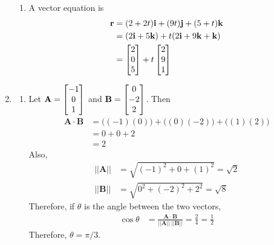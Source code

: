 \documentclass{article}
\begin{document}
\begin{enumerate}
\begin{enumerate}
\item 
A vector equation is 
\begin{align*}
\mathbf{r} &= (2+2t)\mathbf{i} + (9t)\mathbf{j} + (5+t)\mathbf{k} \\
&= (2\mathbf{i} + 5\mathbf{k}) + t(2\mathbf{i} + 9\mathbf{k} + \mathbf{k}) \\
&= \begin{bmatrix} 2 \\ 0 \\ 5 \end{bmatrix} + t \begin{bmatrix} 2 \\ 9 \\1 \end{bmatrix}
\end{align*}
\end{enumerate}
\item
\begin{enumerate}
\item 
Let $\mathbf{A} = \begin{bmatrix}-1 \\ 0 \\ 1\end{bmatrix}$ and $\mathbf{B} = \begin{bmatrix} 0 \\ -2 \\ 2 \end{bmatrix}$. Then
\begin{align*}
  \mathbf{A} \cdot \mathbf{B} &= \big((-1)(0)\big) + \big((0)(-2)\big) + \big((1)(2)\big)\\
  &= 0 + 0 + 2 \\
  &= 2
\end{align*}
Also,
\begin{align*}
  || \mathbf{A} || &= \sqrt{(-1)^2 + 0 + (1)^2} = \sqrt{2} \\
  || \mathbf{B} || &= \sqrt{0^2 + (-2)^2 + 2^2} = \sqrt{8}
\end{align*}
Therefore, if $\theta$ is the angle between the two vectors, 
\begin{align*}
  \cos\theta &= \frac{ \mathbf{A}\cdot \mathbf{B}}{|| \mathbf{A}|| \ || \mathbf{B}||} = \frac{2}{4} = \frac{1}{2}
\end{align*}
Therefore, $\theta = \pi/3$. 


\end{enumerate}
\end{enumerate}
\end{document}
